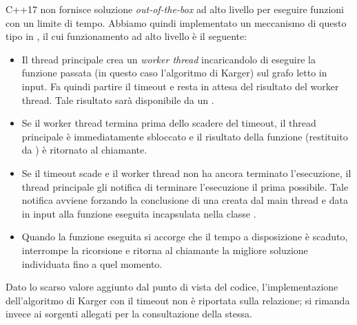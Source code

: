 \noindent C++17 non fornisce soluzione \textit{out-of-the-box} ad alto
livello per eseguire funzioni con un limite di tempo. Abbiamo quindi
implementato un meccanismo di questo tipo in
, il cui funzionamento ad alto livello è
il seguente:

\begin{itemize}
    \item Il thread principale crea un \textit{worker thread}
      incaricandolo di eseguire la funzione passata (in questo caso
      l'algoritmo di Karger) sul grafo letto in input. Fa quindi
      partire il timeout e resta in attesa del risultato del worker
      thread. Tale risultato sarà disponibile da un
      .
    \item Se il worker thread termina prima dello scadere del timeout,
      il thread principale è immediatamente sbloccato e il risultato
      della funzione (restituito da ) è
      ritornato al chiamante.
    \item Se il timeout scade e il worker thread non ha ancora
      terminato l'esecuzione, il thread principale gli notifica di
      terminare l'esecuzione il prima possibile. Tale notifica avviene
      forzando la conclusione di una  creata
      dal main thread e data in input alla funzione eseguita
      incapsulata nella classe .
    \item Quando la funzione eseguita si accorge che il tempo a
      disposizione è scaduto, interrompe la ricorsione e ritorna al
      chiamante la migliore soluzione individuata fino a quel momento.
\end{itemize}

\noindent Dato lo scarso valore aggiunto dal punto di vista del
codice, l'implementazione dell'algoritmo di Karger con il timeout non
è riportata sulla relazione; si rimanda invece ai sorgenti allegati
per la consultazione della stessa.

